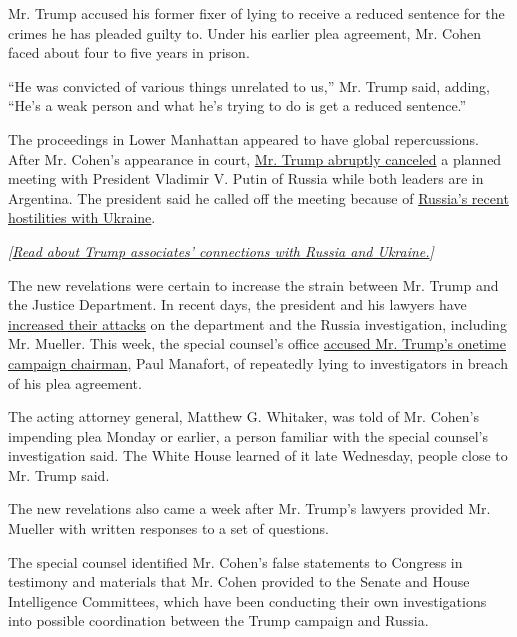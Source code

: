 Mr. Trump accused his former fixer of lying to receive a reduced
sentence for the crimes he has pleaded guilty to. Under his earlier plea
agreement, Mr. Cohen faced about four to five years in prison.

``He was convicted of various things unrelated to us,'' Mr. Trump said,
adding, ``He's a weak person and what he's trying to do is get a reduced
sentence.''

The proceedings in Lower Manhattan appeared to have global
repercussions. After Mr. Cohen's appearance in court,
\href{https://www.nytimes.com/2018/11/29/us/politics/trump-putin-meeting-g20.html}{Mr.
Trump abruptly canceled} a planned meeting with President Vladimir V.
Putin of Russia while both leaders are in Argentina. The president said
he called off the meeting because of
\href{https://www.nytimes.com/2018/11/26/world/europe/russia-ukraine-kerch-strait.html}{Russia's
recent hostilities with Ukraine}.

\emph{{[}}\href{https://www.nytimes.com/2017/02/19/us/politics/donald-trump-ukraine-russia.html}{\emph{Read
about Trump associates' connections with Russia and Ukraine.}}\emph{{]}}

The new revelations were certain to increase the strain between Mr.
Trump and the Justice Department. In recent days, the president and his
lawyers have
\href{https://www.nytimes.com/2018/11/15/us/politics/trump-mueller-russia-inquiry.html}{increased
their attacks} on the department and the Russia investigation, including
Mr. Mueller. This week, the special counsel's office
\href{https://www.nytimes.com/2018/11/26/us/politics/mueller-paul-manafort-cooperation.html}{accused
Mr. Trump's onetime campaign chairman}, Paul Manafort, of repeatedly
lying to investigators in breach of his plea agreement.

The acting attorney general, Matthew G. Whitaker, was told of Mr.
Cohen's impending plea Monday or earlier, a person familiar with the
special counsel's investigation said. The White House learned of it late
Wednesday, people close to Mr. Trump said.

The new revelations also came a week after Mr. Trump's lawyers provided
Mr. Mueller with written responses to a set of questions.

The special counsel identified Mr. Cohen's false statements to Congress
in testimony and materials that Mr. Cohen provided to the Senate and
House Intelligence Committees, which have been conducting their own
investigations into possible coordination between the Trump campaign and
Russia.

